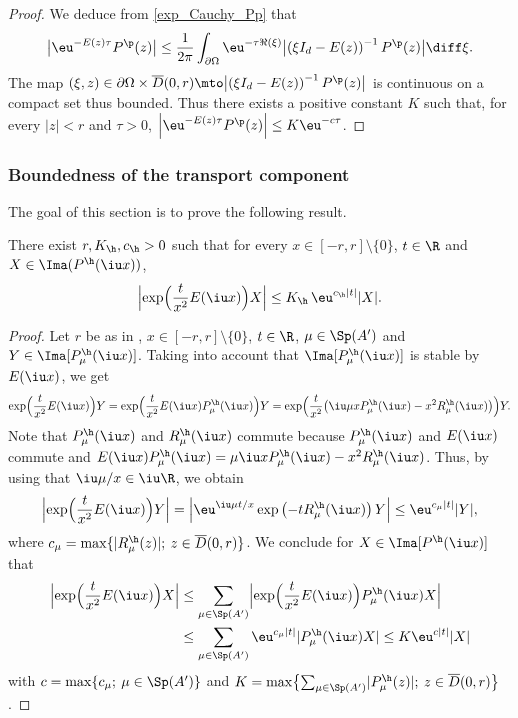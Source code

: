 \begin{proof}
We deduce from \eqref{exp_Cauchy_Pp} that
\[
\bigl| \eu^{-E(z)\tau} P^\p(z) \bigr|
\leq \frac{1}{2\pi }\int_{\partial\Omega} \eu^{-\tau \Re(\xi)} \bigl| \left(\xi I_d - E(z) \right)^{-1} P^\p(z) \bigr| \diff\xi.
\]
The map $(\xi,z)\in\partial\Omega \times \overline{D}(0,r) \mto \bigl| \left(\xi I_d - E(z) \right)^{-1} P^\p(z) \bigr|$ is continuous on a compact set thus bounded. Thus there exists a positive constant $K$ such that, for every $|z|<r$ and $\tau>0$,
$\left| \eu^{-E(z)\tau} P^\p(z) \right| \leq K \eu^{-c\tau}$.
\end{proof}

\subsubsection{Boundedness of the transport component}\label{subsubsec:bound}

The goal of this section is to prove the following result.

\begin{prop} \label{Prop:dissip_h}
There exist $r, K_\h, c_\h >0$ such that for every $x\in [-r,r]\setminus\{0\}$, $t\in\R$ and $X \in \Ima(P^\h(\iu x))$,
\[
\Bigl\lvert \exp\Bigl(\frac{t}{x^2} E(\iu x) \Bigr) X \Bigr\rvert \leq K_\h \,\eu^{c_\h |t|} |X|.
\]
\end{prop}

\begin{proof}
Let $r$ be as in , $x \in [-r,r]\setminus\{0\}$, $t\in\R$, $\mu \in \Sp(A')$ and $Y \in \Ima[P^\h_\mu(\iu x)]$.
Taking into account that $\Ima[P^\h_\mu(\iu x)]$ is stable by $E(\iu x)$, we get
\[
\exp \Bigl(\frac{t}{x^2} E(\iu x) \Bigr) Y
=\exp \Bigl(\frac{t}{x^2} E(\iu x) P_\mu^\h(\iu x) \Bigr) Y \\
=\exp \Bigl(\frac{t}{x^2} \bigl(\iu\mu x P_\mu^\h(\iu x)- x^2 R_\mu^\h(\iu x) \bigr) \Bigr) Y.
\]
Note that $P_\mu^\h(\iu x)$ and $R_\mu^\h(\iu x)$ commute
because $P_\mu^\h(\iu x)$ and $E(\iu x)$ commute and
$E(\iu x)P_\mu^\h(\iu x)=\mu \iu x P_\mu^\h(\iu x)-x^2 R_\mu^\h(\iu x)$. Thus, by using that $\iu \mu/ x \in \iu\R$, we obtain
\[
\Bigl\lvert \exp \Bigl(\frac{t}{x^2} E(\iu x) \Bigr) Y \Bigr\rvert =
\Bigl\lvert\eu^{\iu\mu t/x} \exp\left(-tR_\mu^\h(\iu x) \right) Y\Bigr\rvert
\leq \eu^{c_\mu |t|} | Y |,
\]
where $c_\mu=\max\{ \lvert R_\mu^\h(z)\rvert ;\: z \in \overline{D}(0,r) \}$.
We conclude for $X\in\Ima[P^\h(\iu x)]$ that
\begin{align*}
\Bigl\lvert \exp \Bigl(\frac{t}{x^2} E(\iu x) \Bigr) X \Bigr\rvert
& \leq
\sum_{\mu \in \Sp(A')} \Bigl\lvert \exp \Bigl(\frac{t}{x^2} E(\iu x) \Bigr) P^\h_\mu(\iu x) X \Bigr\rvert
\\ & \leq
\sum_{\mu \in \Sp(A')} \eu^{c_\mu |t|} \lvert P^\h_\mu(\iu x) X \rvert
\leq
K \eu^{c|t|} |X|
\end{align*}
with
$c=\max\{ c_\mu ;\: \mu \in \Sp(A') \}$ and
$K=\max\bigl\{ \sum_{\mu \in \Sp(A')} \lvert P^\h_\mu(z) \rvert;\: z \in \overline{D}(0,r) \bigr\}$.
\end{proof}

